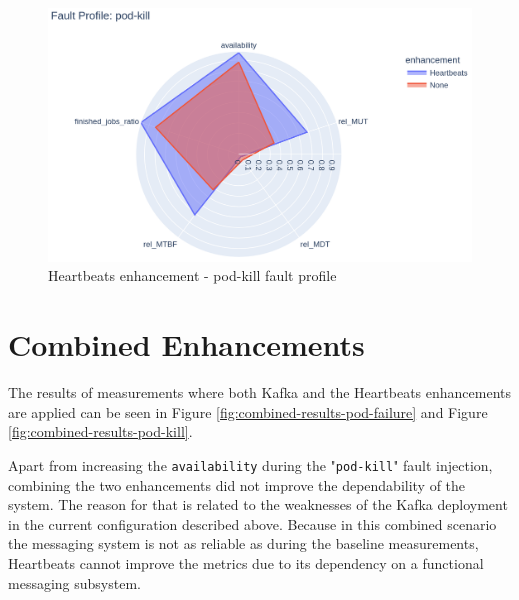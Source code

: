 \begin{figure}[H]
	\centering
	\includegraphics[width=140mm, keepaspectratio]{figures/heartbeats_with_base_pod-kill.png}
	\caption{Heartbeats enhancement - pod-kill fault profile}
	\label{fig:heartbeats-results-pod-kill}
\end{figure}

\section{Combined Enhancements}

The results of measurements where both Kafka and the Heartbeats enhancements are applied can be seen in Figure \ref{fig:combined-results-pod-failure} and Figure \ref{fig:combined-results-pod-kill}.

Apart from increasing the \texttt{availability} during the "\texttt{pod-kill}" fault injection, combining the two enhancements did not improve the dependability of the system. The reason for that is related to the weaknesses of the Kafka deployment in the current configuration described above. Because in this combined scenario the messaging system is not as reliable as during the baseline measurements, Heartbeats cannot improve the metrics due to its dependency on a functional messaging subsystem.


